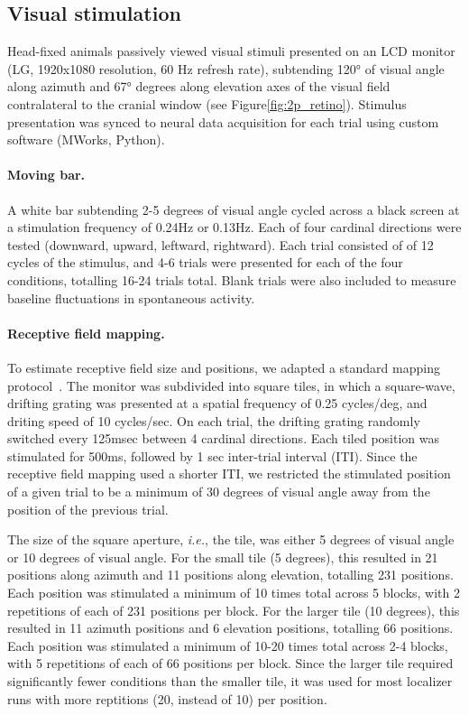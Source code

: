 \subsection{Visual stimulation}
Head-fixed animals passively viewed visual stimuli presented on an LCD monitor (LG, 1920x1080 resolution, 60 Hz refresh rate), subtending \ang{120} of visual angle along azimuth and \ang{67} degrees along elevation axes of the visual field contralateral to the cranial window (see Figure\ref{fig:2p_retino}). Stimulus presentation was synced to neural data acquisition for each trial using custom software (MWorks, Python). 

\paragraph{Moving bar.} A white bar subtending 2-5 degrees of visual angle cycled across a black screen at a stimulation frequency of 0.24Hz or 0.13Hz. Each of four cardinal directions were tested (downward, upward, leftward, rightward). Each trial consisted of of 12 cycles of the stimulus, and 4-6 trials were presented for each of the four conditions, totalling 16-24 trials total. Blank trials were also included to measure baseline fluctuations in spontaneous activity.  

\paragraph{Receptive field mapping.}
To estimate receptive field size and positions, we adapted a standard mapping protocol~\cite{Marques2018}. The monitor was subdivided into square tiles, in which a square-wave, drifting grating was presented at a spatial frequency of 0.25 cycles/deg, and driting speed of 10 cycles/sec. On each trial, the drifting grating randomly switched every 125msec between 4 cardinal directions. Each tiled position was stimulated for 500ms, followed by 1 sec inter-trial interval (ITI). Since the receptive field mapping used a shorter ITI, we restricted the stimulated position of a given trial to be a minimum of 30 degrees of visual angle away from the position of the previous trial. 

The size of the square aperture, \textit{i.e.}, the tile, was either 5 degrees of visual angle or 10 degrees of visual angle. For the small tile (5 degrees), this resulted in 21 positions along azimuth and 11 positions along elevation, totalling 231 positions. Each position was stimulated a minimum of 10 times total across 5 blocks, with 2 repetitions of each of 231 positions per block. For the larger tile (10 degrees), this resulted in 11 azimuth positions and 6 elevation positions, totalling 66 positions. Each position was stimulated a minimum of 10-20 times total across 2-4 blocks, with 5 repetitions of each of 66 positions per block. Since the larger tile required significantly fewer conditions than the smaller tile, it was used for most localizer runs with more reptitions (20, instead of 10) per position. 

